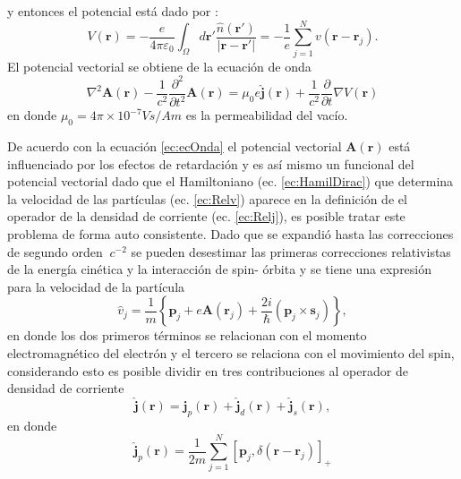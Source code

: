 y entonces el potencial est\'a dado por \cite{Jackson-1975}:
\begin{equation}
	V(\pmb{r}) = - \frac{e}{4 \pi \varepsilon_0} \int_{\Omega} d \pmb{r'} \frac{\hat{n} (\pmb{r'})}{|\pmb{r}-\pmb{r'}|}= - \frac{1}{e} \sum_{j=1}^{N} v(\pmb{r}-\pmb{r}_j). \label{ec:solPoisson}
\end{equation}
\newline
El potencial vectorial se obtiene de la ecuaci\'on de onda \cite{Jackson-1975} 
\begin{equation}
	\nabla^2 \pmb{A} (\pmb{r}) - \frac{1}{c^2} \frac{\partial^2 }{\partial t^2} \pmb{A} (\pmb{r}) = \mu_0 e \pmb{\hat{j}} (\pmb{r}) + \frac{1}{c^2} \frac{\partial}{\partial t} \nabla V(\pmb{r}) \label{ec:ecOnda}  
\end{equation}
en donde $\mu_0 = 4 \pi \times10^{-7} Vs/Am$ es la permeabilidad del vac\'io.
\newline
\par De acuerdo con la ecuaci\'on \ref{ec:ecOnda} el potencial vectorial $\pmb{A} (\pmb{r})$ est\'a influenciado por los efectos de retardaci\'on y es as\'i mismo un funcional del potencial vectorial dado que el Hamiltoniano (ec. \ref{ec:HamilDirac}) que determina la velocidad de las part\'iculas (ec. \ref{ec:Relv}) aparece en la definici\'on de el operador de la densidad de corriente (ec. \ref{ec:Relj}), es posible tratar este problema de forma auto consistente. Dado que se expandi\'o  hasta las correcciones de segundo orden $~ c^{-2}$  se pueden desestimar las primeras correcciones relativistas de la energ\'ia cin\'etica  y la interacci\'on de spin- \'orbita y  se tiene una expresi\'on para la velocidad de la part\'icula \cite{flugge_quantum_1957}
\begin{equation}
	\hat{v}_j = \frac{1}{m} \left\{\pmb{p}_j + e \pmb{A} (\pmb{r}_j) + \frac{2i}{\hbar} (\pmb{p}_j \times \pmb{s}_j) \right\} \label{ec:vel_corr},
\end{equation}  
en donde los dos primeros t\'erminos se relacionan con el momento electromagn\'etico  del electr\'on y el tercero se relaciona con el movimiento del spin, considerando esto es posible dividir en tres contribuciones al operador de densidad de corriente\cite{flugge_quantum_1957}
\begin{equation}
	\hat{\pmb{j}} (\pmb{r}) = \hat{\pmb{j}}_p (\pmb{r}) + \hat{\pmb{j}}_d (\pmb{r}) + \hat{\pmb{j}}_s (\pmb{r}) \label{ec:divJ},
\end{equation}
en donde
\begin{equation}
	\hat{\pmb{j}}_p (\pmb{r}) = \frac{1}{2m} \sum_{j=1}^{N} [\pmb{p}_j , \delta(\pmb{r}-\pmb{r}_j)]_+ \label{ec:Jpara} 
\end{equation} 
